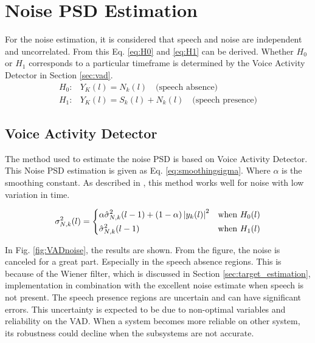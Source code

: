 \section{Noise PSD Estimation} \label{sec:noise_estimation}
For the noise estimation, it is considered that speech and noise are independent and uncorrelated. From this Eq. \ref{eq:H0} and \ref{eq:H1} can be derived. Whether $H_0$ or $H_1$ corresponds to a particular timeframe is determined by the Voice Activity Detector in Section \ref{sec:vad}.
\begin{align}
  H_{0}: & Y_{K}(l) = N_{k}(l) \quad \text{(speech absence)}
  \label{eq:H0} \\
  H_{1}: & Y_{K}(l) = S_{k}(l) + N_{k}(l) \quad \text{(speech presence)}
  \label{eq:H1}
\end{align}

\subsection{Voice Activity Detector}
The method used to estimate the noise PSD is based on Voice Activity Detector. This Noise PSD estimation is given as Eq. \ref{eq:smoothingsigma}. Where $\alpha$ is the smoothing constant. As described in \cite{Hendriks}, this method works well for noise with low variation in time.

\begin{equation}
  \sigma_{N,k}^{2}(l)=
  \begin{dcases}
      \alpha \hat \sigma_{N,k}^{2}(l-1) + (1-\alpha)\abs{y_{k}(l)}^{2} & \text{when } H_{0}(l)\\
      \hat \sigma_{N,k}^{2}(l-1) & \text{when } H_{1}(l)
  \end{dcases}
  \label{eq:smoothingsigma}
\end{equation}

In Fig. \ref{fig:VADnoise}, the results are shown. From the figure, the noise is canceled for a great part. Especially in the speech absence regions. This is because of the Wiener filter, which is discussed in Section \ref{sec:target_estimation}, implementation in combination with the excellent noise estimate when speech is not present. The speech presence regions are uncertain and can have significant errors. This uncertainty is expected to be due to non-optimal variables and reliability on the VAD. When a system becomes more reliable on other system, its robustness could decline when the subsystems are not accurate.


